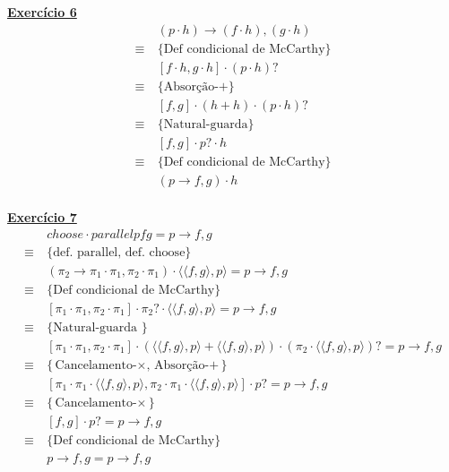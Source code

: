 \documentclass[a4paper,11pt]{article}
\begin{document}
	\noindent \underline{\textbf{Exercício 6}}
	\[
	\begin{aligned}
		&(p \cdot h) \rightarrow (f \cdot h), (g \cdot h) \\
		\equiv \  &\{\text{Def condicional de McCarthy}\}\\
		& [f \cdot h, g \cdot h] \cdot (p \cdot h)? \\
		\equiv \  &\{\text{Absorção-+}\}\\
		& [f, g] \cdot (h + h) \cdot (p \cdot h)? \\
		\equiv \  &\{\text{Natural-guarda}\}\\
		& [f, g] \cdot p? \cdot h \\
		\equiv \  &\{\text{Def condicional de McCarthy}\}\\
		& (p \rightarrow f, g) \cdot h \\
	\end{aligned}
	\]
	
	\noindent \underline{\textbf{Exercício 7}}
	\[
	\begin{aligned}
		& choose \cdot parallel p f g = p \rightarrow f, g \\
		\equiv \  &\{\text{def. parallel, def. choose}\}\\
		& (\pi_2 \rightarrow \pi_1 \cdot \pi_1, \pi_2 \cdot \pi_1) \cdot \langle \langle f, g \rangle, p \rangle = p \rightarrow f, g \\
		\equiv \  &\{\text{Def condicional de McCarthy}\}\\
		& [\pi_1 \cdot \pi_1, \pi_2 \cdot \pi_1] \cdot \pi_2 ? \cdot \langle \langle f, g \rangle, p \rangle = p \rightarrow f, g \\
		\equiv \  &\{\text{Natural-guarda }\}\\
		& [\pi_1 \cdot \pi_1, \pi_2 \cdot \pi_1] \cdot ( \langle \langle f, g \rangle, p \rangle + \langle \langle f, g \rangle, p \rangle ) \cdot (\pi_2 \cdot \langle \langle f, g \rangle, p \rangle)? = p \rightarrow f, g \\
		\equiv \  &\{\text{Cancelamento-$\times$, Absorção-+}\}\\
		& [\pi_1 \cdot \pi_1 \cdot \langle \langle f, g \rangle, p \rangle , \pi_2 \cdot \pi_1 \cdot \langle \langle f, g \rangle, p \rangle] \cdot p? = p \rightarrow f, g \\
		\equiv \  &\{\text{Cancelamento-$\times$}\}\\
		& [f, g] \cdot p? = p \rightarrow f, g \\
		\equiv \  &\{\text{Def condicional de McCarthy}\}\\
		& p \rightarrow f, g = p \rightarrow f, g \\
	\end{aligned}
	\]
	
\end{document}
